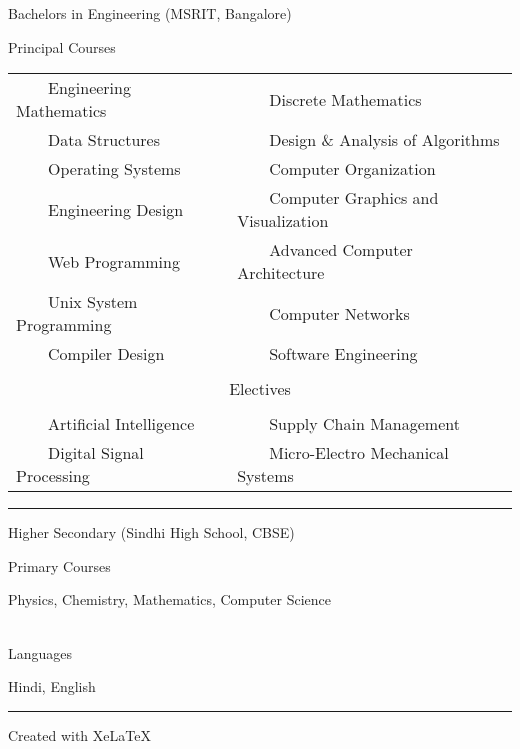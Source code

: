 \documentclass[a4paper,10pt]{article} %
\newcommand{\tabitem}{~~\llap{\textbullet}~~}
\begin{document}
\par{\centering\Large \hypertarget{msrit}{Bachelors in Engineering (MSRIT, Bangalore) }\par}
\large{\centering Principal Courses\par}
\normalsize
\begin{center}
\begin{tabular}{ll}
\tabitem Engineering Mathematics & \tabitem Discrete Mathematics \\
\tabitem Data Structures & \tabitem Design \& Analysis of Algorithms \\
\tabitem Operating Systems & \tabitem Computer Organization \\
\tabitem Engineering Design & \tabitem Computer Graphics and Visualization \\
\tabitem Web Programming & \tabitem Advanced Computer Architecture \\
\tabitem Unix System Programming & \tabitem Computer Networks \\
\tabitem Compiler Design & \tabitem Software Engineering \\
&\\
\multicolumn{2}{c}{\large{\centering Electives\par}} \\ 
&\\
\tabitem Artificial Intelligence  & \tabitem Supply Chain Management  \\
\tabitem Digital Signal Processing & \tabitem Micro-Electro Mechanical Systems\\
\end{tabular}
\end{center}
\bigskip
\hrule
\bigskip

\bigskip

\par{\centering\Large \hypertarget{hs}{Higher Secondary (Sindhi High School, CBSE) }\par}
\begin{center}
\large{Primary Courses\par}
\normalsize
Physics, Chemistry, Mathematics, Computer Science \\
~\\
\large{Languages\par}
\normalsize
Hindi, English \\
\end{center}
\bigskip
\hrule
\bigskip
\vfill
\centerline{Created with Xe\LaTeX\ }
\end{document}
